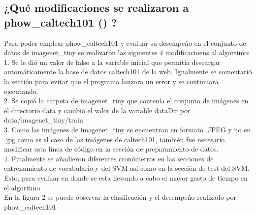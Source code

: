 \documentclass[10pt,twocolumn,letterpaper]{article}
\begin{document}
\subsection{¿Qué modificaciones se realizaron a phow\_caltech101 () ?}

Para poder emplear phow\_caltech101 y evaluar su desempeño en el conjunto de datos de imagenet\_tiny se realizaron las siguientes 4 modificacioens al algortimo:\\

1. Se le dió un valor de falso a la variable inicial que permitía descargar automáticamente la base de datos caltech101 de la web. Igualmente se comentarió la sección para evitar que el programa lanzara un error y se continuara ejecutando.\\

2. Se copió la carpeta de imagenet\_tiny que contenía el conjunto de imágenes en el directorio data y cambió el valor de la variable  dataDir por data/imagenet\_tiny/train.\\

3. Como las imágenes de imagenet\_tiny se encuentran en formato .JPEG y no en .jpg como es el caso de las imágenes de caltech101, también fue necesario modificar esta línea de código en la sección de preparamiento de datos.\\

4. Finalmente se añadieron diferentes cronómetros en las secciones de entrenamiento de vocabulario y del SVM así como en la sección de test del SVM. Esto, para evaluar en donde se esta llevando a cabo el mayor gasto de tiempo en el algoritmo.\\

En la figura 2 se puede observar la clasificación y el desempeño realizado por phow\_caltech101
\end{document}
